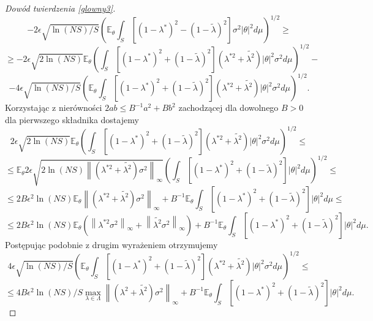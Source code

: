 \documentclass{article}
\newcommand{\norm}[1]{\left\lVert#1\right\rVert}
\begin{document}
\begin{proof}[Dowód twierdzenia \ref{glowny3}]
\begin{displaymath}
-2\epsilon\sqrt{\ln (NS)/S}\left(\mathbb{E}_{\theta}\int_S[(1-\lambda^*)^2-(1-\tilde{\lambda})^2]\sigma^2|\theta |^2 d\mu\right)^{1/2}\geq
\end{displaymath}
\begin{displaymath}
\geq -2\epsilon\sqrt{2\ln (NS)}\mathbb{E}_{\theta}\left(\int_S[(1-\lambda^*)^2+(1-\tilde{\lambda})^2](\lambda^{*2}+\tilde{\lambda^2})|\theta |^2\sigma^2d\mu\right)^{1/2}-
\end{displaymath}
\begin{displaymath}
-4\epsilon\sqrt{\ln (NS)/S}\left(\mathbb{E}_{\theta}\int_S[(1-\lambda^*)^2+(1-\tilde{\lambda})^2](\lambda^{*2}+\tilde{\lambda^2})|\theta |^2\sigma^2 d\mu\right)^{1/2}.
\end{displaymath}
Korzystając  z nierówności $2ab\leq B^{-1}a^2+Bb^2$ zachodzącej dla dowolnego $B>0$ dla pierwszego składnika dostajemy
\begin{displaymath}
2\epsilon\sqrt{2\ln (NS)}\mathbb{E}_{\theta}\left(\int_S[(1-\lambda^*)^2+(1-\tilde{\lambda})^2](\lambda^{*2}+\tilde{\lambda^2})|\theta |^2\sigma^2d\mu\right)^{1/2}\leq
\end{displaymath}
\begin{displaymath}
\leq \mathbb{E}_{\theta}2\epsilon\sqrt{2\ln (NS)\norm{(\lambda^{*2}+\tilde{\lambda^2})\sigma^2}_{\infty}}\left(\int_S[(1-\lambda^*)^2+(1-\tilde{\lambda})^2]|\theta |^2d\mu\right)^{1/2}\leq
\end{displaymath}
\begin{displaymath}
\leq 2B\epsilon^2 \ln (NS)\mathbb{E}_{\theta}\norm{(\lambda^{*2}+\tilde{\lambda^2})\sigma^2}_{\infty}+B^{-1}\mathbb{E}_{\theta}\int_S[(1-\lambda^*)^2+(1-\tilde{\lambda})^2]|\theta |^2d\mu\leq
\end{displaymath}
\begin{displaymath}
\leq 2B\epsilon^2 \ln (NS)\mathbb{E}_{\theta}\left(\norm{\lambda^{*2}\sigma^2}_{\infty}+\norm{\tilde{\lambda^2}\sigma^2}_{\infty}\right)+B^{-1}\mathbb{E}_{\theta}\int_S[(1-\lambda^*)^2+(1-\tilde{\lambda})^2]|\theta |^2d\mu.
\end{displaymath}
Postępując podobnie z drugim wyrażeniem otrzymujemy
\begin{displaymath}
4\epsilon\sqrt{\ln (NS)/S}\left(\mathbb{E}_{\theta}\int_S[(1-\lambda^*)^2+(1-\tilde{\lambda})^2](\lambda^{*2}+\tilde{\lambda^2})|\theta |^2\sigma^2 d\mu\right)^{1/2}\leq
\end{displaymath}
\begin{displaymath}
\leq 4B\epsilon^2\ln (NS)/S\max_{\lambda\in \Lambda}\norm{(\lambda^{2}+\tilde{\lambda^2})\sigma^2}_{\infty}+B^{-1}\mathbb{E}_{\theta}\int_S[(1-\lambda^*)^2+(1-\tilde{\lambda})^2]|\theta |^2d\mu.

\end{displaymath}
\end{proof}
\end{document}
